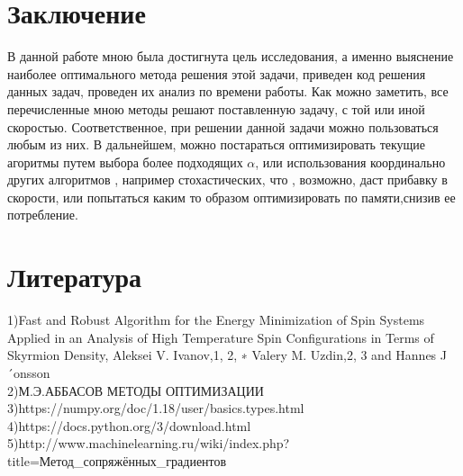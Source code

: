 \documentclass[ 12pt,x11names]{article}
\begin{document}
    \section{Заключение}
    В данной работе мною была достигнута цель исследования, а именно выяснение наиболее оптимального метода решения этой задачи, приведен  код решения данных задач, проведен их анализ по времени работы.
    Как можно заметить, все перечисленные мною методы решают поставленную задачу, с той или иной скоростью. Соответственное, при решении данной задачи можно пользоваться любым из них.
    В дальнейшем, можно постараться оптимизировать текущие агоритмы  путем выбора более подходящих $\alpha$, или использования координально других алгоритмов , например стохастических, что , возможно, даст прибавку в скорости, или попытаться каким то образом оптимизировать по памяти,снизив ее потребление.
\newpage
\section{Литература}
1)Fast and Robust Algorithm for the Energy Minimization of Spin Systems Applied in
an Analysis of High Temperature Spin Configurations in Terms of Skyrmion Density, Aleksei V. Ivanov,1, 2, ∗ Valery M. Uzdin,2, 3 and Hannes J´onsson\\
2)М.Э.АББАСОВ
МЕТОДЫ ОПТИМИЗАЦИИ\\
3)https://numpy.org/doc/1.18/user/basics.types.html\\
4)https://docs.python.org/3/download.html\\
5)http://www.machinelearning.ru/wiki/index.php?title=Метод\_сопряжённых\_градиентов
\end{document}
